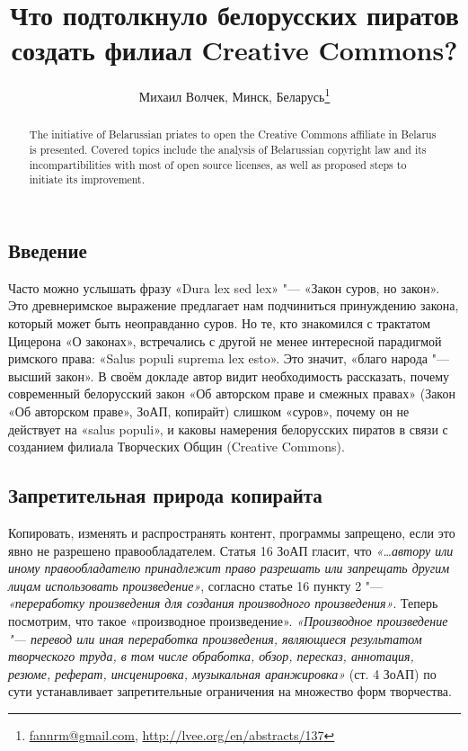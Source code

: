 \documentclass[10pt, a5paper]{article}
\begin{document}
\title{Что подтолкнуло белорусских пиратов создать филиал Creative Commons?}
\author{Михаил Волчек, Минск, Беларусь\footnote{\url{fannrm@gmail.com}, \url{http://lvee.org/en/abstracts/137}}}
\maketitle
\begin{abstract}
The initiative of Belarussian priates to open the Creative Com\-mons affiliate in Belarus is presented. Covered topics include the analysis of Belarussian copyright law and its incompartibilities with most of open source licenses, as well as proposed steps to initiate its improvement.
\end{abstract}
\subsection*{Введение}

Часто можно услышать фразу «Dura lex sed lex» "--- «Закон суров, но закон». Это древнеримское выражение предлагает нам подчиниться принуждению закона, который может быть неоправданно суров. Но те, кто знакомился с трактатом Цицерона «О законах», встречались с другой не менее интересной парадигмой римского права: «Salus populi suprema lex esto». Это значит, «благо народа "--- высший закон». В своём докладе автор видит необходимость рассказать, почему современный белорусский закон «Об авторском праве и смежных правах» (Закон «Об авторском праве», ЗоАП, копирайт) слишком «суров», почему он не действует на «salus populi», и каковы намерения белорусских пиратов в связи с созданием филиала Творческих Общин (Creative Commons).

\subsection*{Запретительная природа копирайта}

Копировать, изменять и распространять контент, программы запрещено, если это явно не разрешено правообладателем. Статья 16 ЗоАП гласит, что \emph{«…автору или иному правообладателю принадлежит право разрешать или запрещать другим лицам использовать произведение»}, согласно статье 16 пункту 2 "--- \emph{«переработку произведения для создания производного произведения»}. Теперь посмотрим, что такое «производное произведение». \emph{«Производное произведение "--- перевод или иная переработка произведения, являющиеся результатом творческого труда, в том числе обработка, обзор, пересказ, аннотация, резюме, реферат, инсценировка, музыкальная аранжировка»} (ст. 4 ЗоАП) по сути устанавливает запретительные ограничения на множество форм творчества.
\end{document}

